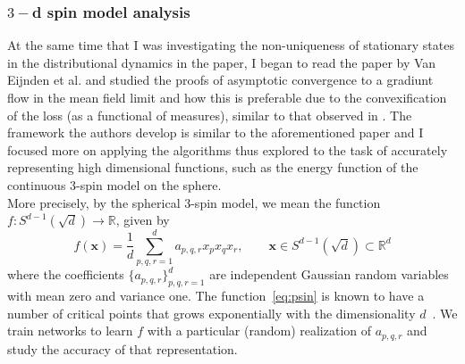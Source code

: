\documentclass{article}
\begin{document}
\subsubsection{$ 3-$d spin model analysis}

At the same time that I was investigating the non-uniqueness of stationary states in the distributional dynamics in the \cite{Mei_2018} paper, I began to read the paper by Van Eijnden et al. \cite{Rotskoff_2022} and studied the proofs of asymptotic convergence to a gradiunt flow in the mean field limit and how this is preferable due to the convexification of the loss (as a functional of measures), similar to that observed in \cite{Mei_2018}. The framework the authors develop is similar to the aforementioned paper and I focused more on applying the algorithms thus explored to the task of accurately representing high dimensional functions, such as the energy function of the continuous 3-spin model on the sphere.\\

More precisely, by the spherical 3-spin model, we mean the function
$f: S^{d-1}(\sqrt{d}) \to \mathbb{R}$, given by
\begin{equation}
  \label{eq:psin}
  f(\mathbf{x}) = \frac1d \sum_{p,q,r=1}^d a_{p,q,r} x_p x_q x_r,  \qquad \mathbf{x}
  \in S^{d-1}(\sqrt{d}) \subset \mathbb{R}^d
\end{equation}
where the coefficients $\{a_{p,q,r}\}_{p,q,r=1}^d$ are independent
Gaussian random variables with mean zero and variance one. The
function~\eqref{eq:psin} is known to have a number of critical points
that grows exponentially with the dimensionality
$d$~\cite{Rotskoff_2022}. We train networks to learn $f$ with a
particular (random) realization of $a_{p,q,r}$ and study the accuracy of that
representation.
\end{document}
